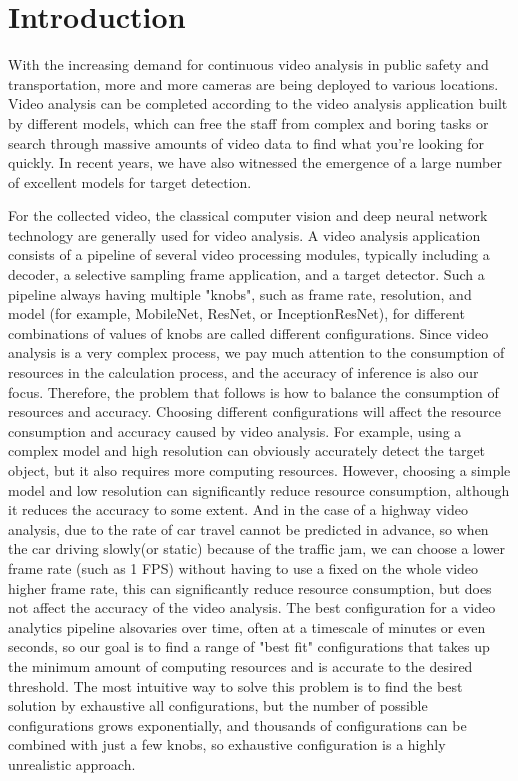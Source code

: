 \section{Introduction}
\label{Section: introduction}
With the increasing demand for continuous video analysis in public safety and transportation, more and more cameras are being deployed to various locations. Video analysis can be completed according to the video analysis application built by different models, which can free the staff from complex and boring tasks or search through massive amounts of video data to find what you're looking for quickly. In recent years, we have also witnessed the emergence of a large number of excellent models for target detection.

For the collected video, the classical computer vision and deep neural network technology are generally used for video analysis. A video analysis application consists of a pipeline of several video processing modules, typically including a decoder, a selective sampling frame application, and a target detector. Such a pipeline always having multiple "knobs", such as frame rate, resolution, and model (for example, MobileNet, ResNet, or InceptionResNet), for different combinations of values of knobs are called different configurations. Since video analysis is a very complex process, we pay much attention to the consumption of resources in the calculation process, and the accuracy of inference is also our focus. Therefore, the problem that follows is how to balance the consumption of resources and accuracy. Choosing different configurations will affect the resource consumption and accuracy caused by video analysis. For example, using a complex model and high resolution can obviously accurately detect the target object, but it also requires more computing resources. However, choosing a simple model and low resolution can significantly reduce resource consumption, although it reduces the accuracy to some extent. And in the case of a highway video analysis, due to the rate of car travel cannot be predicted in advance, so when the car driving slowly(or static) because of the traffic jam, we can choose a lower frame rate (such as 1 FPS) without having to use a fixed on the whole video higher frame rate, this can significantly reduce resource consumption, but does not affect the accuracy of the video analysis. The best configuration for a video analytics pipeline alsovaries over time, often at a timescale of minutes or even seconds\cite{jiang2018chameleon}, so our goal is to find a range of "best fit" configurations that takes up the minimum amount of computing resources and is accurate to the desired threshold. The most intuitive way to solve this problem is to find the best solution by exhaustive all configurations, but the number of possible configurations grows exponentially, and thousands of configurations can be combined with just a few knobs, so exhaustive configuration is a highly unrealistic approach.

